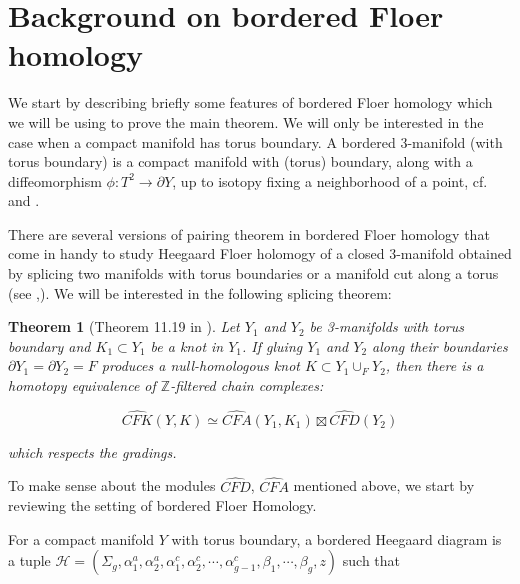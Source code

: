 \documentclass[11pt,reqno]{amsart}
\newtheorem {theorem}{Theorem}
\theoremstyle{definition}
\newtheorem *{remark}{Remark}
\newcommand{\cfkhat}{\widehat{\mathit{CFK}}}
\newcommand{\cfahat}{\widehat{\mathit{CFA}}}
\newcommand{\cfdhat}{\widehat{\mathit{CFD}}}
\newcommand{\cfkminus}{\mathit{CFK}^{-}}
\newcommand{\cfaminus}{\mathit{CFA}^{-}}
\begin{document}
\section{Background on bordered Floer homology}
We start by describing briefly some features of bordered Floer homology which we will be using to prove the main theorem. We will only be interested in the case when a compact manifold has torus boundary. A bordered 3-manifold (with torus boundary) is a compact manifold with (torus) boundary, along with a diffeomorphism $ \phi : T^2 \rightarrow \partial Y$, up to isotopy fixing a neighborhood of a point, cf. \cite{hl16} and \cite [Definition 1.4] {lotnotes}. 

There are several versions of pairing theorem \cite[Theorem 1.3] {lot08} in bordered Floer homology that come in handy to study Heegaard Floer holomogy of a closed 3-manifold obtained by splicing two manifolds with torus boundaries or a manifold cut along a torus (see \cite{hl16},\cite{hanselman17}). We will be interested in the following splicing theorem:
\begin{theorem}[Theorem 11.19 in \cite{lot08}]
\label{splice}
Let $Y_1$ and $Y_2$ be 3-manifolds with torus boundary and $K_1 \subset Y_1$ be a knot in $Y_1$. If gluing $Y_1$ and $Y_2$ along their boundaries
$ \partial Y_1 = \partial Y_2 = F$ produces a null-homologous knot $K \subset Y_1 \cup_F Y_2$, then there is a homotopy equivalence of $\mathbb{Z}$-filtered chain complexes:

\begin{equation}
    \cfkhat(Y,K) \simeq \cfahat(Y_1,K_1)\boxtimes \cfdhat(Y_2)
\end{equation}

which respects the gradings.
\end{theorem}

To make sense about the modules $\cfdhat$, $\cfahat$ mentioned above, we start by reviewing the setting of bordered Floer Homology.

For a compact manifold $Y$ with torus boundary, a bordered Heegaard diagram is a tuple $\mathcal{H} = (\Sigma_g, \alpha_1^a, \alpha_2^a,\alpha_1^c,\alpha_2^c, \cdots, \alpha_{g-1}^c,\beta_1,\cdots,\beta_g,z)$ such that 
\end{document}

